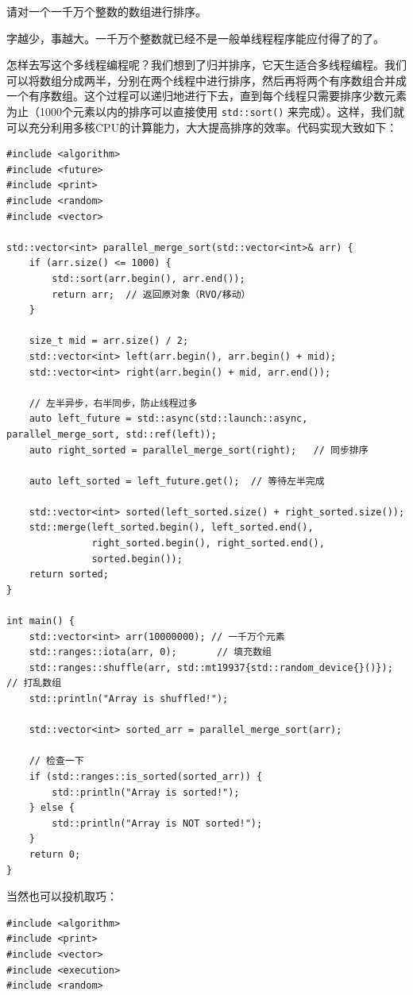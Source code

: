 \begin{example}{}{}

请对一个一千万个整数的数组进行排序。

\tcblower

字越少，事越大。一千万个整数就已经不是一般单线程程序能应付得了的了。

怎样去写这个多线程编程呢？我们想到了归并排序，它天生适合多线程编程。我们可以将数组分成两半，分别在两个线程中进行排序，然后再将两个有序数组合并成一个有序数组。这个过程可以递归地进行下去，直到每个线程只需要排序少数元素为止（1000个元素以内的排序可以直接使用 \verb|std::sort()| 来完成）。这样，我们就可以充分利用多核CPU的计算能力，大大提高排序的效率。代码实现大致如下：

\begin{verbatim}
#include <algorithm>
#include <future>
#include <print>
#include <random>
#include <vector>

std::vector<int> parallel_merge_sort(std::vector<int>& arr) {
	if (arr.size() <= 1000) {
		std::sort(arr.begin(), arr.end());
		return arr;  // 返回原对象（RVO/移动）
	}

	size_t mid = arr.size() / 2;
	std::vector<int> left(arr.begin(), arr.begin() + mid);
	std::vector<int> right(arr.begin() + mid, arr.end());

	// 左半异步，右半同步，防止线程过多
	auto left_future = std::async(std::launch::async, parallel_merge_sort, std::ref(left));
	auto right_sorted = parallel_merge_sort(right);   // 同步排序

	auto left_sorted = left_future.get();  // 等待左半完成

	std::vector<int> sorted(left_sorted.size() + right_sorted.size());
	std::merge(left_sorted.begin(), left_sorted.end(),
			   right_sorted.begin(), right_sorted.end(),
			   sorted.begin());
	return sorted;
}

int main() {
	std::vector<int> arr(10000000); // 一千万个元素
	std::ranges::iota(arr, 0);       // 填充数组
	std::ranges::shuffle(arr, std::mt19937{std::random_device{}()}); // 打乱数组
	std::println("Array is shuffled!");

	std::vector<int> sorted_arr = parallel_merge_sort(arr);

	// 检查一下
	if (std::ranges::is_sorted(sorted_arr)) {
		std::println("Array is sorted!");
	} else {
		std::println("Array is NOT sorted!");
	}
	return 0;
}
\end{verbatim}

当然也可以投机取巧：
\begin{verbatim}
#include <algorithm>
#include <print>
#include <vector>
#include <execution>
#include <random>


\end{verbatim}
\end{example}
